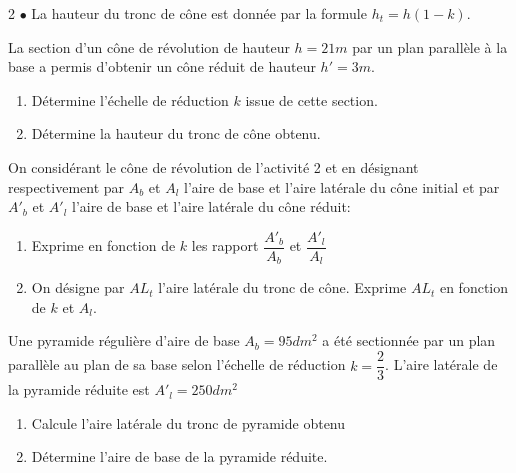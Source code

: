 \begin{multicols*}{2}
{  		$\bullet$ La hauteur du tronc de cône est donnée par la formule $h_{t}=h\left(1-k\right)$.
  	}
  	
  	\hspace*{0.5cm} La section d'un cône de révolution de hauteur $h=21m$ par un plan parallèle à la base a permis d'obtenir un cône réduit de hauteur $h'=3m$.
  	\begin{enumerate}
  		\item Détermine l'échelle de réduction $k$ issue de cette section.
  		\item Détermine la hauteur du tronc de cône obtenu.
  	\end{enumerate}
  	\dures
  	 
  	
  	On considérant le cône de révolution de l'activité 2 et en désignant  respectivement par $A_{b}$ et $A_{l}$ l'aire de base et l'aire latérale du cône initial et par  $A'_{b}$ et $A'_{l}$ l'aire de base et l'aire latérale du cône réduit:
  	\begin{enumerate}
  		\item Exprime en fonction de $k$ les rapport $\dfrac{A'_{b}}{A_{b}}$ et $\dfrac{A'_{l}}{A_{l}}$  
  		\item On désigne par $AL_{t}$ l'aire latérale du tronc de cône. Exprime $AL_{t}$  en fonction de $k$ et $A_{l}$. 
  	\end{enumerate}
  	\dures
  	 
  	
  	Une pyramide régulière  d'aire de base $A_{b}=95dm^2$ a été sectionnée par un plan parallèle au plan de sa base selon l'échelle de réduction $k=\dfrac{2}{3}$. L'aire latérale de la pyramide réduite est $A'_{l}=250 dm^2$ 
  	\begin{enumerate}
  		\item Calcule l'aire latérale du tronc de pyramide obtenu 
  		\item Détermine l'aire de base de la pyramide réduite.  
  	\end{enumerate}
  	\dures
  	 

\end{multicols*}
